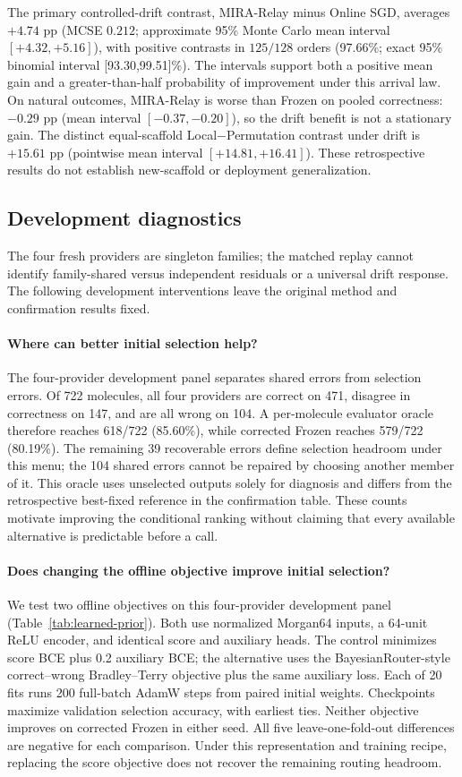 \documentclass[sigconf,anonymous]{aamas}
\begin{document}
The primary controlled-drift contrast, MIRA-Relay minus Online SGD, averages
$+4.74$ pp (MCSE $0.212$; approximate 95\% Monte Carlo mean interval $[+4.32,+5.16]$),
with positive contrasts in $125/128$ orders (97.66\%; exact 95\% binomial
interval [93.30,99.51]\%). The intervals support both a positive mean gain and a greater-than-half probability of improvement under this arrival law.
On natural outcomes, MIRA-Relay is worse than Frozen on pooled correctness:
$-0.29$ pp (mean interval $[-0.37,-0.20]$), so the drift benefit is not a stationary gain.
The distinct equal-scaffold Local$-$Permutation contrast under drift is
$+15.61$ pp (pointwise mean interval $[+14.81,+16.41]$).
These retrospective results do not establish new-scaffold or deployment generalization.

\subsection{Development diagnostics}
The four fresh providers are singleton families; the matched replay cannot identify family-shared versus independent residuals or a universal drift response. The following development interventions leave the original method and confirmation results fixed.

\paragraph{Where can better initial selection help?}
The four-provider development panel separates shared errors from selection errors. Of 722 molecules, all four providers are correct on 471, disagree in correctness on 147, and are all wrong on 104. A per-molecule evaluator oracle therefore reaches 618/722 (85.60\%), while corrected Frozen reaches 579/722 (80.19\%). The remaining 39 recoverable errors define selection headroom under this menu; the 104 shared errors cannot be repaired by choosing another member of it. This oracle uses unselected outputs solely for diagnosis and differs from the retrospective best-fixed reference in the confirmation table. These counts motivate improving the conditional ranking without claiming that every available alternative is predictable before a call.

\paragraph{Does changing the offline objective improve initial selection?}
We test two offline objectives on this four-provider development panel (Table~\ref{tab:learned-prior}). Both use normalized Morgan64 inputs, a 64-unit ReLU encoder, and identical score and auxiliary heads. The control minimizes score BCE plus 0.2 auxiliary BCE; the alternative uses the BayesianRouter-style correct--wrong Bradley--Terry objective plus the same auxiliary loss. Each of 20 fits runs 200 full-batch AdamW steps from paired initial weights. Checkpoints maximize validation selection accuracy, with earliest ties. Neither objective improves on corrected Frozen in either seed. All five leave-one-fold-out differences are negative for each comparison. Under this representation and training recipe, replacing the score objective does not recover the remaining routing headroom.
\end{document}
